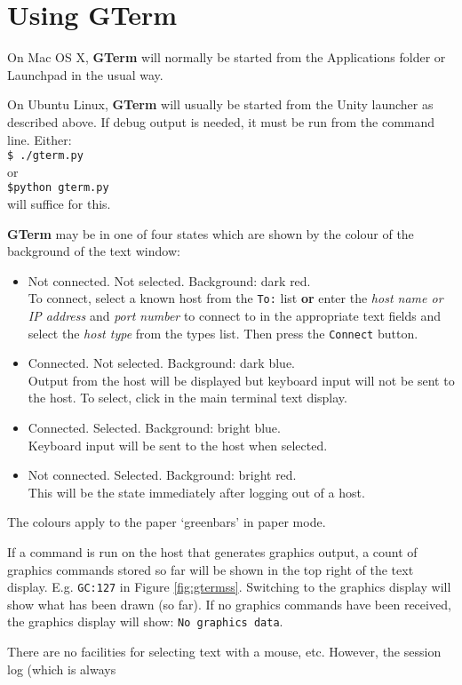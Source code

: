 \documentclass[a4paper,twoside,11pt]{article}
\newcommand{\newpara}{\par\vspace{4mm}\noindent}
\begin{document}
\section{Using \textbf{GTerm}}
On Mac OS X, \textbf{GTerm} will normally be started from the Applications folder or Launchpad in the usual way.
\newpara
On Ubuntu Linux,
\textbf{GTerm} will usually be started from the Unity launcher as described above. If debug output is needed, it must be
run from the command line. Either:\\
\texttt{\$ ./gterm.py}\\
or\\
\texttt{\$python gterm.py}\\
will suffice for this.
\newpara
\textbf{GTerm} may be in one of four states which are shown by the colour of the background of the text window:
\begin{itemize}
\item Not connected. Not selected. Background: dark red.\\
      To connect, select a known host from the \texttt{To:} list \textbf{or} enter the \textit{host name or IP address}
      and \textit{port number} to connect to in the appropriate
      text fields and select the \textit{host type} from the types list. Then press the \texttt{Connect} button.
\item Connected. Not selected. Background: dark blue.\\
      Output from the host will be displayed but keyboard input will not be sent to the host.
      To select, click in the main terminal text display.
\item Connected. Selected. Background: bright blue.\\
      Keyboard input will be sent to the host when selected.
\item Not connected. Selected. Background: bright red.\\
      This will be the state immediately after logging out of a host.
\end{itemize}
The colours apply to the paper `greenbars' in paper mode.
\newpara
If a command is run on the host that generates graphics output, a count of graphics commands
stored so far will be shown in the top right of the text display. E.g. \texttt{GC:127} in Figure \ref{fig:gtermss}.
Switching to the graphics display will show what has been drawn (so far). If no graphics commands have been
received, the graphics display will show: \texttt{No graphics data}.
\newpara
There are no facilities for selecting text with a mouse, etc. However, the session log (which is always
\end{document}
